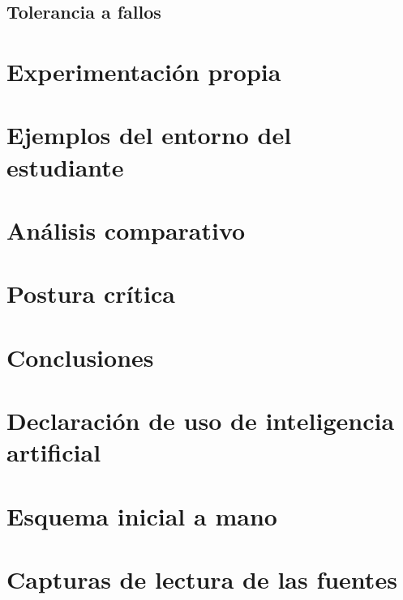 \documentclass[12pt,a4paper]{article}
\begin{document}
\subsection{Tolerancia a fallos}
\section{Experimentación propia}
\section{Ejemplos del entorno del estudiante}
\section{Análisis comparativo}
\section{Postura crítica}
\section{Conclusiones}
\section{Declaración de uso de inteligencia artificial}

\printbibliography

\appendix
\section{Esquema inicial a mano}
\section{Capturas de lectura de las fuentes}
\end{document}
